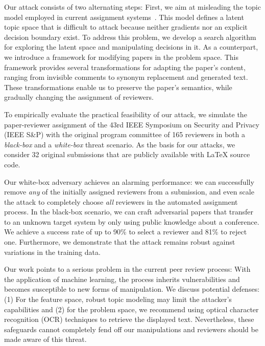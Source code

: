 \documentclass[letterpaper,twocolumn,10pt]{article}
\begin{document}
Our attack consists of two alternating steps: 
First, we aim at misleading the topic model employed in current assignment systems~\cite{charlin-13-toronto, misc-autobid}. This model defines a latent topic space that is difficult to attack because neither gradients nor an explicit decision boundary exist. To address this problem, we develop a search algorithm for exploring the latent space and manipulating decisions in it.
As a counterpart, we introduce a framework for modifying papers in the problem space. This framework provides several transformations for adapting the paper's content, ranging from invisible comments to synonym replacement and generated text. These transformations enable us to preserve the paper's semantics, while gradually changing the assignment of reviewers.

To empirically evaluate the practical feasibility of our attack, we simulate the paper-reviewer assignment of the 43rd IEEE Symposium on Security and Privacy (IEEE S\&P) with the original program committee of 165 reviewers in both a \emph{black-box} and a \emph{white-box} threat scenario. As the basis for our attacks, we consider 32 original submissions that are publicly available with \LaTeX{} source code. 

Our white-box adversary achieves an alarming performance: we can successfully remove \emph{any} of the initially assigned reviewers from a submission, and even scale the attack to completely choose \emph{all} reviewers in the automated assignment process. 
In the black-box scenario, we can craft adversarial papers that transfer to an unknown target system by only using public knowledge about a conference. We achieve a success rate of up to 90\% to select a reviewer and 81\% to reject one. Furthermore, we demonstrate that the attack remains robust against variations in the training data.

Our work points to a serious problem in the current peer review process: With the application of machine learning, the process inherits vulnerabilities and becomes susceptible to new forms of manipulation.
We discuss potential defenses: (1) For the feature space, robust topic modeling may limit the attacker's capabilities and (2) for the problem space, we recommend using optical character recognition (OCR) techniques to retrieve the displayed text.
Nevertheless, these safeguards cannot completely fend off our manipulations and reviewers should be made aware of this threat.
\end{document}
